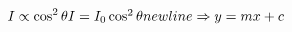 \documentclass[10pt]{book}
\begin{document}
\begin{mdSnippets}
\begin{mdDisplaySnippet}[43fd7ccd9d79429989a8fe131c1e8739]%
\[%
I\propto\cos^2\theta$$

I=I_0\cos^2\theta\\newline
\Rightarrow y=mx+c
\]%
\end{mdDisplaySnippet}%

\end{mdSnippets}
\end{document}
